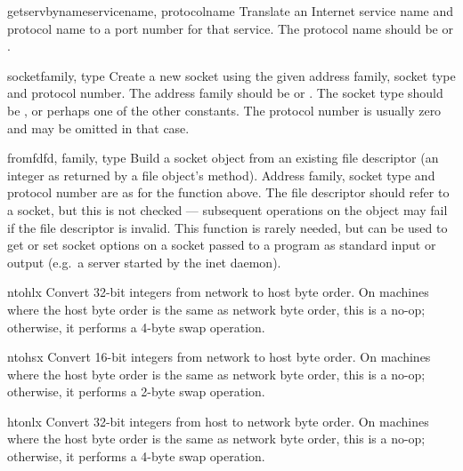 \begin{funcdesc}{getservbyname}{servicename, protocolname}
Translate an Internet service name and protocol name to a port number
for that service.  The protocol name should be  or
.
\end{funcdesc}

\begin{funcdesc}{socket}{family, type}
Create a new socket using the given address family, socket type and
protocol number.  The address family should be  or
.  The socket type should be ,
 or perhaps one of the other  constants.
The protocol number is usually zero and may be omitted in that case.
\end{funcdesc}

\begin{funcdesc}{fromfd}{fd, family, type}
Build a socket object from an existing file descriptor (an integer as
returned by a file object's  method).  Address family,
socket type and protocol number are as for the  function
above.  The file descriptor should refer to a socket, but this is not
checked --- subsequent operations on the object may fail if the file
descriptor is invalid.  This function is rarely needed, but can be
used to get or set socket options on a socket passed to a program as
standard input or output (e.g.\ a server started by the \UNIX{} inet
daemon).
\end{funcdesc}

\begin{funcdesc}{ntohl}{x}
Convert 32-bit integers from network to host byte order.  On machines
where the host byte order is the same as network byte order, this is a
no-op; otherwise, it performs a 4-byte swap operation.
\end{funcdesc}

\begin{funcdesc}{ntohs}{x}
Convert 16-bit integers from network to host byte order.  On machines
where the host byte order is the same as network byte order, this is a
no-op; otherwise, it performs a 2-byte swap operation.
\end{funcdesc}

\begin{funcdesc}{htonl}{x}
Convert 32-bit integers from host to network byte order.  On machines
where the host byte order is the same as network byte order, this is a
no-op; otherwise, it performs a 4-byte swap operation.
\end{funcdesc}

